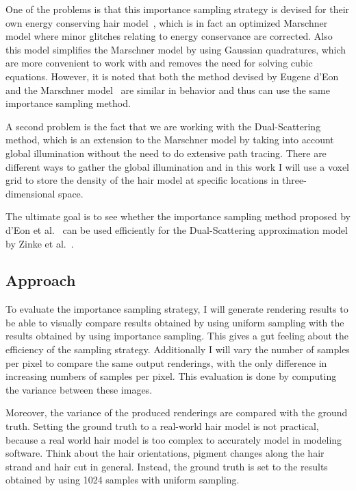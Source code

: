 \documentclass[11pt,a4paper]{report}
\begin{document}
One of the problems is that this importance sampling strategy is devised for their own energy conserving hair model~\cite{eon2011}, which is in fact an optimized Marschner model where minor glitches relating to energy conservance are corrected. Also this model simplifies the Marschner model by using Gaussian quadratures, which are more convenient to work with and removes the need for solving cubic equations. However, it is noted that both the method devised by Eugene d'Eon~\cite{eon2011} and the Marschner model~\cite{marschner} are similar in behavior and thus can use the same importance sampling method.

A second problem is the fact that we are working with the Dual-Scattering method, which is an extension to the Marschner model by taking into account global illumination without the need to do extensive path tracing. There are different ways to gather the global illumination and in this work I will use a voxel grid to store the density of the hair model at specific locations in three-dimensional space.

The ultimate goal is to see whether the importance sampling method proposed by d'Eon et al.~\cite{eon2013} can be used efficiently for the Dual-Scattering approximation model by Zinke et al.~\cite{zinke}.

\subsection*{Approach}

To evaluate the importance sampling strategy, I will generate rendering results to be able to visually compare results obtained by using uniform sampling with the results obtained by using importance sampling. This gives a gut feeling about the efficiency of the sampling strategy. Additionally I will vary the number of samples per pixel to compare the same output renderings, with the only difference in increasing numbers of samples per pixel. This evaluation is done by computing the variance between these images.

Moreover, the variance of the produced renderings are compared with the ground truth. Setting the ground truth to a real-world hair model is not practical, because a real world hair model is too complex to accurately model in modeling software. Think about the hair orientations, pigment changes along the hair strand and hair cut in general. Instead, the ground truth is set to the results obtained by using 1024 samples with uniform sampling.\\
\end{document}
